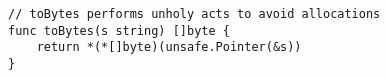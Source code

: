 
\begin{lstlisting}[language=Golang, label=lst:unsafe-string-to-bytes-direct, caption=Incorrect direct cast between string and slice]
// toBytes performs unholy acts to avoid allocations
func toBytes(s string) []byte {
    return *(*[]byte)(unsafe.Pointer(&s))
}
\end{lstlisting}